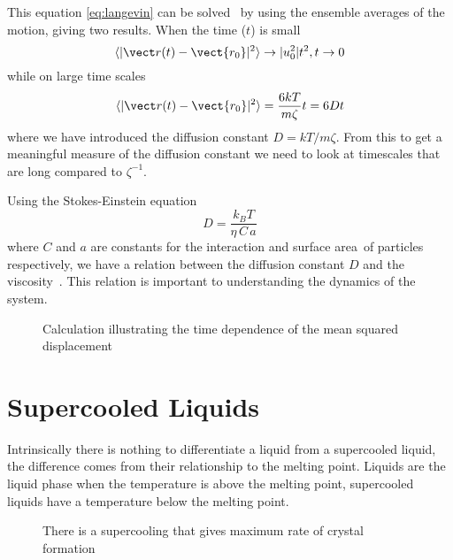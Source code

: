 This equation \eqref{eq:langevin} can be solved~\cite{mcquarrie:76} by using the ensemble averages of the motion, giving two results. When the time ($t$) is small
\begin{equation}
    \langle | \vect r(t) - \vect{r_0}|^2 \rangle \rightarrow |u_0^2|t^2,   t \rightarrow 0
\end{equation}
while on large time scales
\begin{equation}
    \langle | \vect r(t) - \vect{r_0} |^2 \rangle = \frac{6kT}{m\zeta} t = 6Dt
\end{equation}
where we have introduced the diffusion constant $D = kT/m\zeta$. From this to get a meaningful measure of the diffusion constant we need to look at timescales that are long compared to $\zeta^{-1}$.

Using the Stokes-Einstein equation
\begin{equation}
    D=\frac{k_B T}{\eta\,C\,a}
\end{equation}
where $C$ and $a$ are constants for the interaction and surface area~\tocheck of particles respectively, we have a relation between the diffusion constant $D$ and the viscosity~\tocite. This relation is important to understanding the dynamics of the system.

\begin{figure}
    \label{fig:MSD}
    \caption{Calculation illustrating the time dependence of the mean squared displacement}
\end{figure}



\section{Supercooled Liquids}

Intrinsically there is nothing to differentiate a liquid from a supercooled liquid, the difference comes from their relationship to the melting point. Liquids are the liquid phase when the temperature is above the melting point, supercooled liquids have a temperature below the melting point.

\begin{figure}
    \caption{There is a supercooling that gives maximum rate of crystal formation}
    \label{fig:supercool crys}
\end{figure}


